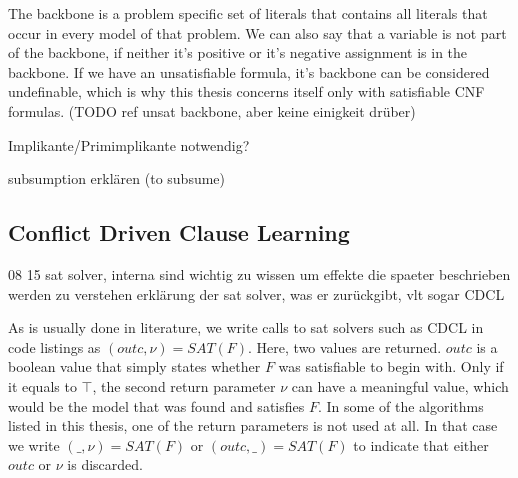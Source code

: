 The backbone is a problem specific set of literals that contains all literals that occur in every model of that problem. We can also say that a variable is not part of the backbone, if neither it's positive or it's negative assignment is in the backbone. If we have an unsatisfiable formula, it's backbone can be considered undefinable, which is why this thesis concerns itself only with satisfiable CNF formulas. (TODO ref unsat backbone, aber keine einigkeit drüber)

Implikante/Primimplikante notwendig?

subsumption erklären (to subsume)

\subsection{Conflict Driven Clause Learning}
08 15 sat solver, interna sind wichtig zu wissen um effekte die spaeter beschrieben werden zu verstehen
erklärung der sat solver, was er zurückgibt, vlt sogar CDCL


As is usually done in literature, we write calls to sat solvers such as CDCL in code listings as $(outc,\nu) = SAT(F)$. Here, two values are returned. $outc$ is a boolean value that simply states whether $F$ was satisfiable to begin with. Only if it equals to $\top$, the second return parameter $\nu$ can have a meaningful value, which would be the model that was found and satisfies $F$. In some of the algorithms listed in this thesis, one of the return parameters is not used at all. In that case we write $(\_,\nu) = SAT(F)$ or $(outc,\_) = SAT(F)$ to indicate that either $outc$ or $\nu$ is discarded.